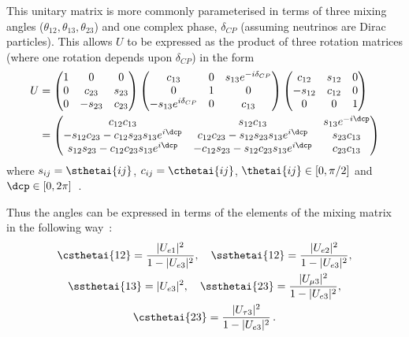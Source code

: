 This unitary matrix is more commonly parameterised in terms of three mixing angles ($\theta_{12}, \theta_{13}, \theta_{23}$) and one complex phase, $\delta_{CP}$ (assuming neutrinos are Dirac particles).
This allows $U$ to be expressed as the product of three rotation matrices (where one rotation depends upon $\delta_{CP}$) in the form
\begin{align}
  U &=
  \begin{pmatrix}
    1 & 0       & 0 \\
    0 & c_{23}  & s_{23} \\
    0 & -s_{23} & c_{23}  
  \end{pmatrix}
  \begin{pmatrix}
    c_{13}                  & 0 & s_{13}e^{-i\delta_{CP}} \\
    0                       & 1 & 0 \\
    -s_{13}e^{i\delta_{CP}} & 0 & c_{13}
  \end{pmatrix}
  \begin{pmatrix}
    c_{12}  & s_{12} & 0 \\
    -s_{12} & c_{12} & 0 \\
    0       & 0      & 1
  \end{pmatrix}
  \\
  &=
  \begin{pmatrix}
    c_{12}c_{13} & s_{12}c_{13} & s_{13} e^{-i\dcp} \\
    -s_{12}c_{23}-c_{12}s_{23}s_{13}e^{i\dcp} & c_{12}c_{23}-s_{12}s_{23}s_{13}e^{i\dcp} & s_{23}c_{13} \\
    s_{12}s_{23}-c_{12}c_{23}s_{13}e^{i\dcp} & -c_{12}s_{23}-s_{12}c_{23}s_{13}e^{i\dcp} & c_{23}c_{13}
  \end{pmatrix}
\end{align}
where $s_{ij} = \sthetai{ij}$, $c_{ij} = \cthetai{ij}$, $\thetai{ij} \in [0, \pi/2]$ and $\dcp \in [0, 2\pi]$~\cite{pmnsMatrix}.

Thus the angles can be expressed in terms of the elements of the mixing matrix in the following way~\cite{pdg2018}:
\begin{gather*}
  \csthetai{12} = \frac{|U_{e1}|^{2}}{1 - |U_{e3}|^{2}}, \quad \ssthetai{12} = \frac{|U_{e2}|^{2}}{1 - |U_{e3}|^{2}}, \\
  \ssthetai{13} = |U_{e3}|^{2}, \quad \ssthetai{23} = \frac{|U_{\mu 3}|^{2}}{1 - |U_{e3}|^{2}}, \\
  \csthetai{23} = \frac{|U_{\tau 3}|^{2}}{1 - |U_{e3}|^{2}} \, .
\end{gather*}

